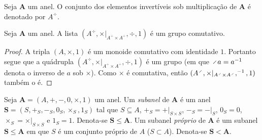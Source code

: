 \begin{definition}
Seja $\bm A$ um anel. O conjunto dos elementos invertíveis sob multiplicação de $\bm A$ é denotado por $A^{\div}$.
\end{definition}

\begin{proposition}
Seja $\bm A$ um anel. A lista $(A^{\div},\times|_{A^{\div} \times A^{\div}},\div,1)$ é um grupo comutativo.
\end{proposition}
\begin{proof}
A tripla $(A,\times,1)$ é um monoide comutativo com identidade $1$. Portanto segue que a quádrupla $(A^{\div},\times|_{A^{\div} \times A^{\div}},\div,1)$ é um grupo (em que $\div a = a\inv$ denota o inverso de $a$ sob $\times$). Como $\times$ é comutativa, então $(A^{\div},\times|_{A^{\div} \times A^{\div}},\inv,1)$ também o é.
\end{proof}

\begin{definition}
Seja $\bm A=(A,+,-,0,\times,1)$ um anel. Um \emph{subanel} de $\bm A$ é um anel $\bm S=(S,+_S,-_{S},0_S,\times_S,1_S)$ tal que $S \subseteq A$, $+_S = +|_{S \times S}$, $-_S = -|_{S}$, $0_S=0$, $\times_S = \times|_{S \times S}$ e $1_S=1$. Denota-se $\bm S \leq \bm A$. Um subanel \emph{próprio} de $\bm A$ é um subanel $\bm S \leq \bm A$ em que $S$ é um conjunto próprio de $A$ ($S \subset A$). Denota-se $\bm S < \bm A$.
\end{definition}

